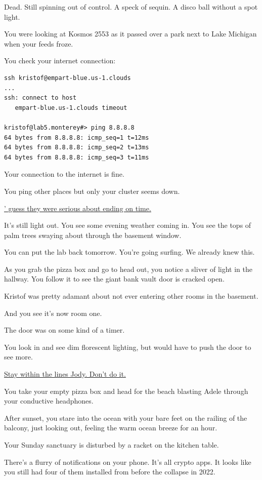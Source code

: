 \documentclass[17pt, twoside, a5paper, openright, extrafontsizes]{memoir}
\renewcommand{\emph}[1]{\ul{#1}}
\begin{document}
Dead. Still spinning out of control. A speck of sequin. A disco ball
without a spot light.

You were looking at Kosmos 2553 as it passed over a park next to Lake
Michigan when your feeds froze.

You check your internet connection:

\begin{verbatim}
ssh kristof@empart-blue.us-1.clouds
...
ssh: connect to host 
   empart-blue.us-1.clouds timeout

kristof@lab5.monterey#> ping 8.8.8.8
64 bytes from 8.8.8.8: icmp_seq=1 t=12ms
64 bytes from 8.8.8.8: icmp_seq=2 t=13ms
64 bytes from 8.8.8.8: icmp_seq=3 t=11ms
\end{verbatim}

Your connection to the internet is fine.

You ping other places but only your cluster seems down.

\emph{' guess they were serious about ending on time.}

It's still light out. You see some evening weather coming in. You see
the tops of palm trees swaying about through the basement window.

You can put the lab back tomorrow. You're going surfing. We already knew
this.

As you grab the pizza box and go to head out, you notice a sliver of
light in the hallway. You follow it to see the giant bank vault door is
cracked open.

Kristof was pretty adamant about not ever entering other rooms in the
basement.

And you see it's now room one.

The door was on some kind of a timer.

You look in and see dim florescent lighting, but would have to push the
door to see more.

\emph{Stay within the lines Jody. Don't do it.}

You take your empty pizza box and head for the beach blasting Adele
through your conductive headphones.

After sunset, you stare into the ocean with your bare feet on the
railing of the balcony, just looking out, feeling the warm ocean breeze
for an hour.

Your Sunday sanctuary is disturbed by a racket on the kitchen table.

There's a flurry of notifications on your phone. It's all crypto apps.
It looks like you still had four of them installed from before the
collapse in 2022.
\end{document}
